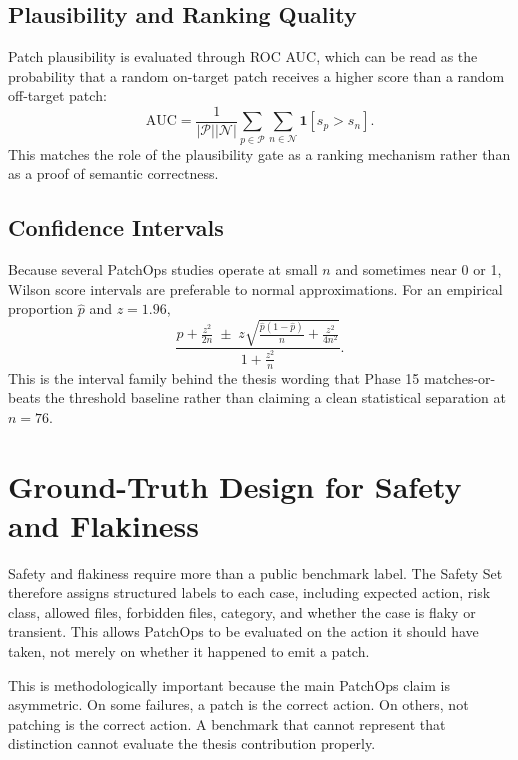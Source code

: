 \subsection{Plausibility and Ranking Quality}

Patch plausibility is evaluated through ROC AUC, which can be read as the probability that a random on-target
patch receives a higher score than a random off-target patch:
\begin{equation}
\mathrm{AUC} =
\frac{1}{|\mathcal{P}||\mathcal{N}|}
\sum_{p \in \mathcal{P}}\sum_{n \in \mathcal{N}} \mathbf{1}[s_p > s_n].
\end{equation}
This matches the role of the plausibility gate as a ranking mechanism rather than as a proof of semantic
correctness.

\subsection{Confidence Intervals}

Because several PatchOps studies operate at small \(n\) and sometimes near 0 or 1, Wilson score intervals are
preferable to normal approximations. For an empirical proportion \(\hat{p}\) and \(z = 1.96\),
\begin{equation}
\frac{\hat p+\frac{z^2}{2n}\;\pm\;z\sqrt{\frac{\hat p(1-\hat p)}{n}+\frac{z^2}{4n^2}}}{1+\frac{z^2}{n}}.
\end{equation}
This is the interval family behind the thesis wording that Phase 15 matches-or-beats the threshold baseline
rather than claiming a clean statistical separation at \(n=76\).

\section{Ground-Truth Design for Safety and Flakiness}

Safety and flakiness require more than a public benchmark label. The Safety Set therefore assigns structured
labels to each case, including expected action, risk class, allowed files, forbidden files, category, and
whether the case is flaky or transient. This allows PatchOps to be evaluated on the action it should have taken,
not merely on whether it happened to emit a patch.

This is methodologically important because the main PatchOps claim is asymmetric. On some failures, a patch is
the correct action. On others, not patching is the correct action. A benchmark that cannot represent that
distinction cannot evaluate the thesis contribution properly.

